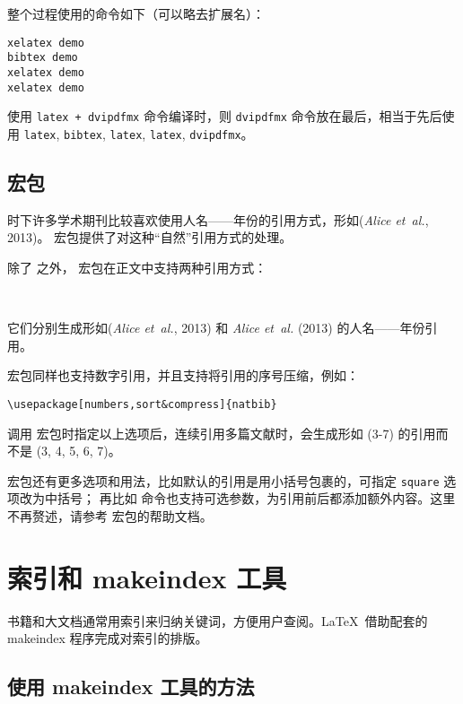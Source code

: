 整个过程使用的命令如下（可以略去扩展名）：
\begin{verbatim}
xelatex demo
bibtex demo
xelatex demo
xelatex demo
\end{verbatim}

使用 \texttt{latex + dvipdfmx} 命令编译时，则 \texttt{dvipdfmx} 命令放在最后，相当于先后使用
\texttt{latex}, \texttt{bibtex}, \texttt{latex}, \texttt{latex}, \texttt{dvipdfmx}。

\subsection{ 宏包}\label{subsec:natbib}

时下许多学术期刊比较喜欢使用人名——年份的引用方式，形如(\emph{Alice et~al.}, 2013)。
 宏包提供了对这种“自然”引用方式的处理。

除了  之外， 宏包在正文中支持两种引用方式：
\begin{command}
 \\
\end{command}

它们分别生成形如(\emph{Alice et~al.}, 2013) 和 \emph{Alice et~al.} (2013) 的人名——年份引用。

 宏包同样也支持数字引用，并且支持将引用的序号压缩，例如：
\begin{verbatim}
\usepackage[numbers,sort&compress]{natbib}
\end{verbatim}
调用  宏包时指定以上选项后，连续引用多篇文献时，会生成形如 (3-7) 的引用而不是 (3, 4, 5, 6, 7)。

 宏包还有更多选项和用法，比如默认的引用是用小括号包裹的，可指定 \texttt{square} 选项改为中括号；
再比如  命令也支持可选参数，为引用前后都添加额外内容。这里不再赘述，请参考  宏包的帮助文档。

\section{索引和 makeindex 工具}\label{sec:index}

书籍和大文档通常用索引来归纳关键词，方便用户查阅。\LaTeX\ 借助配套的 makeindex 程序完成对索引的排版。

\subsection{使用 makeindex 工具的方法}\label{subsec:makeidx}

